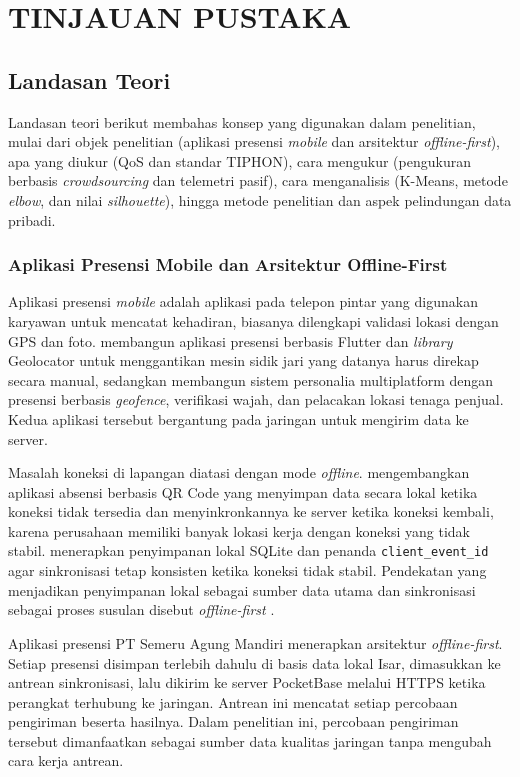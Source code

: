 \chapter{TINJAUAN PUSTAKA}

\section{Landasan Teori}
Landasan teori berikut membahas konsep yang digunakan dalam penelitian, mulai dari objek penelitian (aplikasi presensi \textit{mobile} dan arsitektur \textit{offline-first}), apa yang diukur (QoS dan standar TIPHON), cara mengukur (pengukuran berbasis \textit{crowdsourcing} dan telemetri pasif), cara menganalisis (K-Means, metode \textit{elbow}, dan nilai \textit{silhouette}), hingga metode penelitian dan aspek pelindungan data pribadi.

\subsection{Aplikasi Presensi Mobile dan Arsitektur Offline-First}
Aplikasi presensi \textit{mobile} adalah aplikasi pada telepon pintar yang digunakan karyawan untuk mencatat kehadiran, biasanya dilengkapi validasi lokasi dengan GPS dan foto. \textcite{ismail2023presensi} membangun aplikasi presensi berbasis Flutter dan \textit{library} Geolocator untuk menggantikan mesin sidik jari yang datanya harus direkap secara manual, sedangkan \textcite{rokhman2026personalia} membangun sistem personalia multiplatform dengan presensi berbasis \textit{geofence}, verifikasi wajah, dan pelacakan lokasi tenaga penjual. Kedua aplikasi tersebut bergantung pada jaringan untuk mengirim data ke server.

Masalah koneksi di lapangan diatasi dengan mode \textit{offline}. \textcite{indah2025offline} mengembangkan aplikasi absensi berbasis QR Code yang menyimpan data secara lokal ketika koneksi tidak tersedia dan menyinkronkannya ke server ketika koneksi kembali, karena perusahaan memiliki banyak lokasi kerja dengan koneksi yang tidak stabil. \textcite{rokhman2026personalia} menerapkan penyimpanan lokal SQLite dan penanda \texttt{client\_event\_id} agar sinkronisasi tetap konsisten ketika koneksi tidak stabil. Pendekatan yang menjadikan penyimpanan lokal sebagai sumber data utama dan sinkronisasi sebagai proses susulan disebut \textit{offline-first} \parencite{devina2026offlinefirst}.

Aplikasi presensi PT Semeru Agung Mandiri menerapkan arsitektur \textit{offline-first}. Setiap presensi disimpan terlebih dahulu di basis data lokal Isar, dimasukkan ke antrean sinkronisasi, lalu dikirim ke server PocketBase melalui HTTPS ketika perangkat terhubung ke jaringan. Antrean ini mencatat setiap percobaan pengiriman beserta hasilnya. Dalam penelitian ini, percobaan pengiriman tersebut dimanfaatkan sebagai sumber data kualitas jaringan tanpa mengubah cara kerja antrean.

